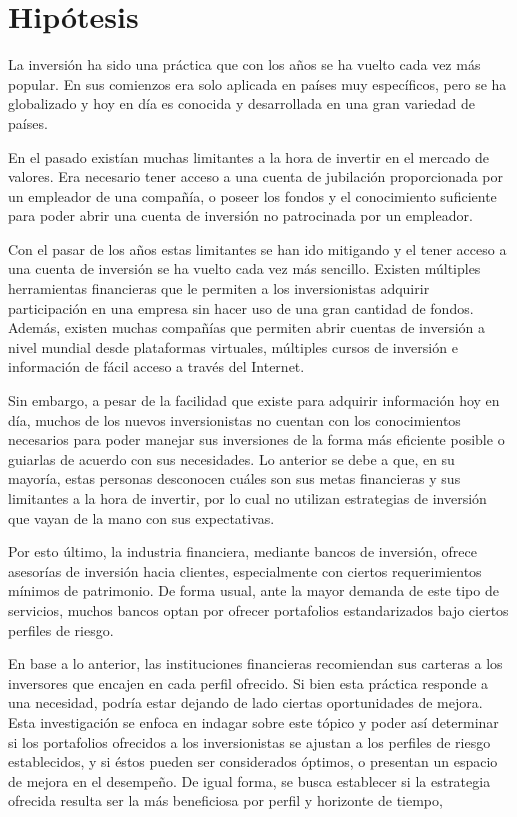 \documentclass[a4paper,fleqn]{cas-sc}
\begin{document}
\section{Hipótesis} 
La inversión ha sido una práctica que con los años se ha vuelto cada vez más popular. En
sus comienzos era solo aplicada en países muy específicos, pero se ha globalizado y hoy en día es
conocida y desarrollada en una gran variedad de países. 

En el pasado existían muchas limitantes a la hora de invertir en el mercado de valores. Era necesario
tener acceso a una cuenta de jubilación proporcionada por un empleador de una compañía, o poseer
los fondos y el conocimiento suficiente para poder abrir una cuenta de inversión no patrocinada por
un empleador.

Con el pasar de los años estas limitantes se han ido mitigando y el tener acceso a una cuenta de
inversión se ha vuelto cada vez más sencillo. Existen múltiples herramientas financieras que le
permiten a los inversionistas adquirir participación en una empresa sin hacer uso de una gran cantidad
de fondos. Además, existen muchas compañías que permiten abrir cuentas de inversión a nivel
mundial desde plataformas virtuales, múltiples cursos de inversión e información de fácil acceso a
través del Internet.

Sin embargo, a pesar de la facilidad que existe para adquirir información hoy en día, muchos de los
nuevos inversionistas no cuentan con los conocimientos necesarios para poder manejar sus
inversiones de la forma más eficiente posible o guiarlas de acuerdo con sus necesidades. Lo anterior
se debe a que, en su mayoría, estas personas desconocen cuáles son sus metas financieras y sus
limitantes a la hora de invertir, por lo cual no utilizan estrategias de inversión que vayan de la mano
con sus expectativas.

Por esto último, la industria financiera, mediante bancos de inversión, ofrece asesorías de inversión
hacia clientes, especialmente con ciertos requerimientos mínimos de patrimonio. De forma usual,
ante la mayor demanda de este tipo de servicios, muchos bancos optan por ofrecer portafolios
estandarizados bajo ciertos perfiles de riesgo.

En base a lo anterior, las instituciones financieras recomiendan sus carteras a los inversores que
encajen en cada perfil ofrecido. Si bien esta práctica responde a una necesidad, podría estar dejando
de lado ciertas oportunidades de mejora. Esta investigación se enfoca en indagar sobre este tópico y
poder así determinar si los portafolios ofrecidos a los inversionistas se ajustan a los perfiles de riesgo
establecidos, y si éstos pueden ser considerados óptimos, o presentan un espacio de mejora en el
desempeño. De igual forma, se busca establecer si la estrategia ofrecida resulta ser la más beneficiosa
por perfil y horizonte de tiempo,
\end{document}
